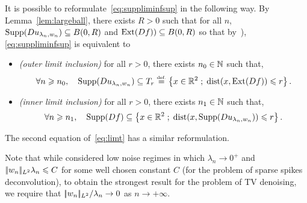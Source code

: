 \begin{rem}
  It is possible to reformulate~\eqref{eq:suppliminfsup} in the following way. By Lemma~\ref{lem:largeball}, there exists $R>0$ such that for all $n$, $\operatorname{Supp}(Du_{\lambda_n,w_n})\subseteq B(0,R)$ and $\operatorname{Ext}(Df))\subseteq B(0,R)$ so that by~\cite[Thm. 4.10]{rockafellarwets}), \eqref{eq:suppliminfsup} is equivalent to
 \begin{itemize}
   \item \textit{(outer limit inclusion)} for all $r>0$, there exists $n_0\in \mathbb{N}$ such that,
     \begin{equation*}
  \forall n\geqslant n_0,\quad     \operatorname{Supp}(Du_{\lambda_n,w_n}) \subseteq T_r \stackrel{\mbox{\upshape\tiny def.}}{=}  \left\{ x\in \mathbb{R}^2 \;;\; \mathrm{dist}(x,\operatorname{Ext}(Df))\leqslant r  \right\}.
     \end{equation*}
   \item \textit{(inner limit inclusion)} for all $r>0$, there exists $n_1\in \mathbb{N}$ such that,
     \begin{equation*}
  \forall n\geqslant n_1,\quad    \operatorname{Supp}(Df) \subseteq  \left\{ x\in \mathbb{R}^2 \;;\; \mathrm{dist}(x,\operatorname{Supp}(Du_{\lambda_n,w_n}))\leqslant r  \right\}.
     \end{equation*}
 \end{itemize}
The second equation of~\eqref{eq:limt} has a similar reformulation.
\end{rem}

\begin{rem}
Note that while \cite{duvalpeyre13} considered low noise regimes  in which $\lambda_n \to 0^+$ and $|\!| w_n |\!|_{L^2}\lambda_n\leqslant C$ for some well chosen constant $C$ (for the problem of sparse spikes deconvolution), to obtain the strongest result for the problem of TV denoising, we require that ${|\!| w_n |\!|_{L^2}}/{\lambda_n}\to 0$ as $n\to +\infty$.
\end{rem}


